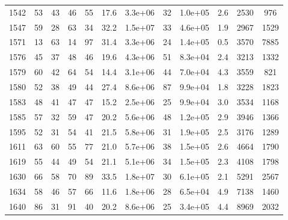 \begin{table}
\begin{tabular}{cccccccccccc}
1542 & 53 & 43 & 46 & 55 & 17.6 & 3.3e+06 & 32 & 1.0e+05 & 2.6 & 2530 & 976 \\
1547 & 59 & 28 & 63 & 34 & 32.2 & 1.5e+07 & 33 & 4.6e+05 & 1.9 & 2967 & 1529 \\
1571 & 13 & 63 & 14 & 97 & 31.4 & 3.3e+06 & 24 & 1.4e+05 & 0.5 & 3570 & 7885 \\
1576 & 45 & 37 & 48 & 46 & 19.6 & 4.3e+06 & 51 & 8.3e+04 & 2.4 & 3213 & 1332 \\
1579 & 60 & 42 & 64 & 54 & 14.4 & 3.1e+06 & 44 & 7.0e+04 & 4.3 & 3559 & 821 \\
1580 & 52 & 38 & 49 & 44 & 27.4 & 8.6e+06 & 87 & 9.9e+04 & 1.8 & 3228 & 1823 \\
1583 & 48 & 41 & 47 & 47 & 15.2 & 2.5e+06 & 25 & 9.9e+04 & 3.0 & 3534 & 1168 \\
1585 & 57 & 32 & 59 & 47 & 20.2 & 5.6e+06 & 48 & 1.2e+05 & 2.9 & 3946 & 1366 \\
1595 & 52 & 31 & 54 & 41 & 21.5 & 5.8e+06 & 31 & 1.9e+05 & 2.5 & 3176 & 1289 \\
1611 & 63 & 60 & 55 & 77 & 21.0 & 5.7e+06 & 38 & 1.5e+05 & 2.6 & 4664 & 1790 \\
1619 & 55 & 44 & 49 & 54 & 21.1 & 5.1e+06 & 34 & 1.5e+05 & 2.3 & 4108 & 1798 \\
1630 & 66 & 58 & 70 & 89 & 33.5 & 1.8e+07 & 30 & 6.1e+05 & 2.1 & 5291 & 2567 \\
1634 & 58 & 46 & 57 & 66 & 11.6 & 1.8e+06 & 28 & 6.5e+04 & 4.9 & 7138 & 1460 \\
1640 & 86 & 31 & 91 & 40 & 20.2 & 8.6e+06 & 25 & 3.4e+05 & 4.4 & 8969 & 2032 \\
\end{tabular}
\end{table}
